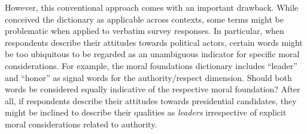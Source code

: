 \documentclass[12pt]{article}
\begin{document}
However, this conventional approach comes with an important drawback. While \citet{graham2009liberals} conceived the dictionary as applicable across contexts, some terms might be problematic when applied to verbatim survey responses. In particular, when respondents describe their attitudes towards political actors, certain words might be too ubiquitous to be regarded as an unambiguous indicator for specific moral considerations. For example, the moral foundations dictionary includes ``leader'' and ``honor'' as signal words for the authority/respect dimension. Should both words be considered equally indicative of the respective moral foundation? After all, if respondents describe their attitudes towards presidential candidates, they might be inclined to describe their qualities as \textit{leaders} irrespective of explicit moral considerations related to authority.
\end{document}
